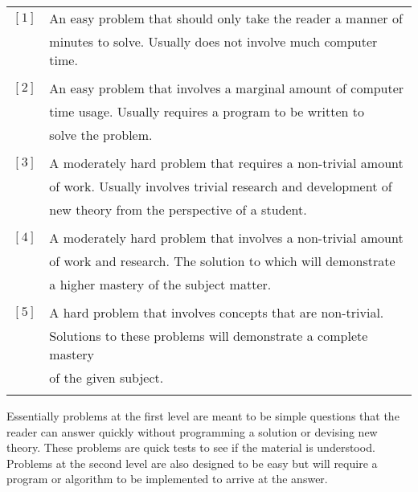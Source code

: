 \documentclass[b5paper]{book}
\begin{document}
\vspace{5mm}
\begin{tabular}{cl}
$\left [ 1 \right ]$ & An easy problem that should only take the reader a manner of \\
                     & minutes to solve.  Usually does not involve much computer time. \\
                     & \\
$\left [ 2 \right ]$ & An easy problem that involves a marginal amount of computer \\
                     & time usage.  Usually requires a program to be written to \\
                     & solve the problem. \\
                     & \\
$\left [ 3 \right ]$ & A moderately hard problem that requires a non-trivial amount \\
                     & of work.  Usually involves trivial research and development of \\
                     & new theory from the perspective of a student. \\
                     & \\
$\left [ 4 \right ]$ & A moderately hard problem that involves a non-trivial amount \\
                     & of work and research.  The solution to which will demonstrate \\
                     & a higher mastery of the subject matter. \\
                     & \\
$\left [ 5 \right ]$ & A hard problem that involves concepts that are non-trivial.  \\
                     & Solutions to these problems will demonstrate a complete mastery \\
                     & of the given subject. \\
                     & \\
\end{tabular}

Essentially problems at the first level are meant to be simple questions that the reader can answer quickly without programming a solution or
devising new theory.  These problems are quick tests to see if the material is understood.  Problems at the second level are also
designed to be easy but will require a program or algorithm to be implemented to arrive at the answer.  
\end{document}
